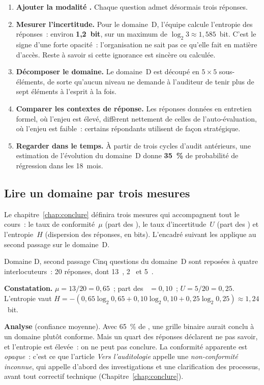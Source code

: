 \begin{enumerate}
    \item \textbf{Ajouter la modalité \NEK{}.} Chaque question admet
          désormais trois réponses.
    \item \textbf{Mesurer l'incertitude.} Pour le domaine~D, l'équipe
          calcule l'entropie des réponses~: environ \textbf{1,2~bit}, sur un
          maximum de $\log_2 3 \approx 1{,}585$~bit. C'est le signe d'une
          forte opacité~: l'organisation ne sait pas ce qu'elle fait en
          matière d'accès. Reste à savoir si cette ignorance est sincère ou
          calculée.
    \item \textbf{Décomposer le domaine.} Le domaine~D est découpé en
          $5 \times 5$ sous-éléments, de sorte qu'aucun niveau ne demande à
          l'auditeur de tenir plus de sept éléments à l'esprit à la fois.
    \item \textbf{Comparer les contextes de réponse.} Les réponses données en
          entretien formel, où l'enjeu est élevé, diffèrent nettement de
          celles de l'auto-évaluation, où l'enjeu est faible~: certains
          répondants utilisent \NEK{} de façon stratégique.
    \item \textbf{Regarder dans le temps.} À partir de trois cycles d'audit
          antérieurs, une estimation de l'évolution du domaine~D donne
          \textbf{35~\%} de probabilité de régression dans les 18~mois.
\end{enumerate}

\subsection{Lire un domaine par trois mesures}

Le chapitre~\ref{chap:conclure} définira trois mesures qui accompagnent
tout le cours~: le taux de conformité~$\mu$ (part des \OUI{}), le taux
d'incertitude~$U$ (part des \NEK{}) et l'entropie~$H$ (dispersion des
réponses, en bits). L'encadré suivant les applique au second passage sur le
domaine~D.

\begin{boxlecture}{Domaine D, second passage}
Cinq questions du domaine~D sont reposées à quatre interlocuteurs~: 20
réponses, dont 13~\OUI{}, 2~\NON{} et 5~\NEK{}.

\medskip
\textbf{Constatation.} $\mu = 13/20 = 0{,}65$~; part des \NON{}~$= 0{,}10$~;
$U = 5/20 = 0{,}25$. L'entropie vaut
$H = -(0{,}65\log_2 0{,}65 + 0{,}10\log_2 0{,}10 + 0{,}25\log_2 0{,}25)
\approx 1{,}24$~bit.

\medskip
\textbf{Analyse} (confiance moyenne). Avec 65~\% de \OUI{}, une grille
binaire aurait conclu à un domaine plutôt conforme. Mais un quart des
réponses déclarent ne pas savoir, et l'entropie est élevée~: on ne peut pas
conclure. La conformité apparente est \emph{opaque}~: c'est ce que l'article
\emph{Vers l'auditologie} appelle une \emph{non-conformité inconnue}, qui
appelle d'abord des investigations et une clarification des processus,
avant tout correctif technique (Chapitre~\ref{chap:conclure}).

\medskip
\hfill{}
\end{boxlecture}

